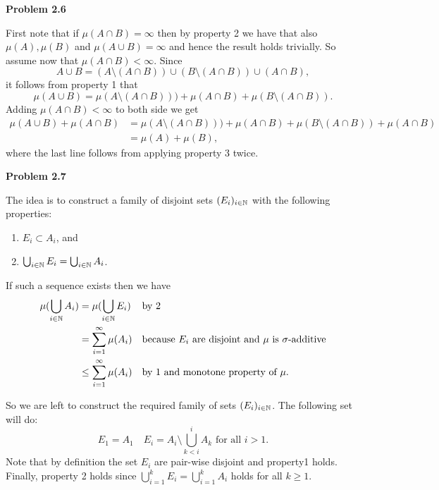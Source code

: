 

\textbf{Problem 2.6}

First note that if $\mu(A \cap B) = \infty$ then by property 2 we have that also $\mu(A), \mu(B)$ and $\mu(A \cup B) = \infty$ and hence the result holds trivially. So assume now that $\mu(A \cap B) < \infty$. Since 
\[
	A \cup B = (A \setminus (A\cap B)) \cup (B \setminus (A \cap B)) \cup (A \cap B),
\] 
it follows from property 1 that
\[
	\mu(A \cup B) = \mu(A \setminus (A \cap B))) + \mu(A \cap B) + \mu(B \setminus (A \cap B)).
\] 
Adding $\mu(A \cap B) < \infty$ to both side we get
\begin{align*}
	\mu(A \cup B) + \mu(A \cap B) 
	&= \mu(A \setminus (A \cap B))) + \mu(A \cap B) + \mu(B \setminus (A \cap B)) + \mu(A \cap B)\\
	&= \mu(A) + \mu(B), 
\end{align*}
where the last line follows from applying property 3 twice.  
 
\bigskip 

\textbf{Problem 2.7}

The idea is to construct a family of disjoint sets $(E_i)_{i \in \mathbb N}$ with the following properties:
\begin{enumerate}
\item $E_i \subset A_i$, and
\item $\bigcup_{i \in \mathbb N} E_i = \bigcup_{i \in \mathbb N} A_i$.
\end{enumerate}

If such a sequence exists then we have
\begin{align*}
	\mu(\bigcup_{i \in \mathbb N} A_i) &= \mu(\bigcup_{i \in \mathbb N} E_i) &&\text{by 2}\\
	&= \sum_{i = 1}^\infty \mu(A_i) &&\text{because $E_i$ are disjoint and $\mu$ is $\sigma$-additive}\\
	&\le \sum_{i = 1}^\infty \mu(A_i) &&\text{by 1 and monotone property of $\mu$}.
\end{align*}

So we are left to construct the required family of sets $(E_i)_{i \in \mathbb N}$. The following set will do:
\[
	E_1 = A_1 \quad E_i = A_i \setminus \bigcup_{k < i}^i A_k \text{ for all } i > 1.
\]
Note that by definition the set $E_i$ are pair-wise disjoint and property1 holds. Finally, property 2 holds since $\bigcup_{i = 1}^k E_i = \bigcup_{i = 1}^k A_i$ holds for all $k \ge 1$.

\bigskip

